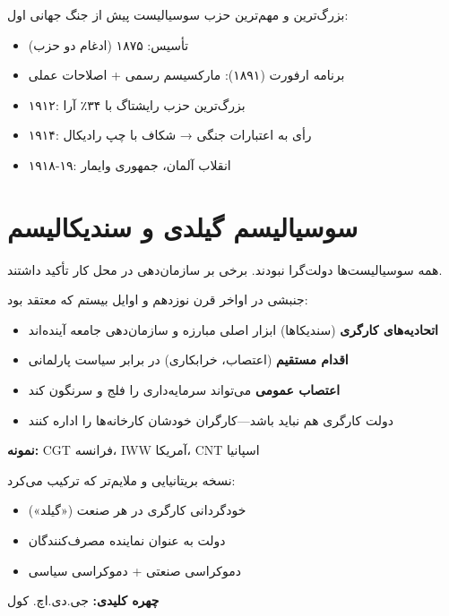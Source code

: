 \begin{historybox}
بزرگ‌ترین و مهم‌ترین حزب سوسیالیست پیش از جنگ جهانی اول:
\begin{itemize}[nosep]
    \item تأسیس: ۱۸۷۵ (ادغام دو حزب)
    \item برنامه ارفورت (۱۸۹۱): مارکسیسم رسمی + اصلاحات عملی
    \item ۱۹۱۲: بزرگ‌ترین حزب رایشتاگ با ۳۴٪ آرا
    \item ۱۹۱۴: رأی به اعتبارات جنگی → شکاف با چپ رادیکال
    \item ۱۹۱۸-۱۹: انقلاب آلمان، جمهوری وایمار
\end{itemize}
\end{historybox}

\section{سوسیالیسم گیلدی و سندیکالیسم}

همه سوسیالیست‌ها دولت‌گرا نبودند. برخی بر سازمان‌دهی در محل کار تأکید داشتند.

\begin{defbox}
جنبشی در اواخر قرن نوزدهم و اوایل بیستم که معتقد بود:
\begin{itemize}[nosep]
    \item \textbf{اتحادیه‌های کارگری} (سندیکاها) ابزار اصلی مبارزه و سازمان‌دهی جامعه آینده‌اند
    \item \textbf{اقدام مستقیم} (اعتصاب، خرابکاری) در برابر سیاست پارلمانی
    \item \textbf{اعتصاب عمومی} می‌تواند سرمایه‌داری را فلج و سرنگون کند
    \item دولت کارگری هم نباید باشد—کارگران خودشان کارخانه‌ها را اداره کنند
\end{itemize}
\textbf{نمونه:} CGT فرانسه، IWW آمریکا، CNT اسپانیا
\end{defbox}

\begin{defbox}
نسخه بریتانیایی و ملایم‌تر که ترکیب می‌کرد:
\begin{itemize}[nosep]
    \item خودگردانی کارگری در هر صنعت («گیلد»)
    \item دولت به عنوان نماینده مصرف‌کنندگان
    \item دموکراسی صنعتی + دموکراسی سیاسی
\end{itemize}
\textbf{چهره کلیدی:} جی.دی.اچ. کول
\end{defbox}

